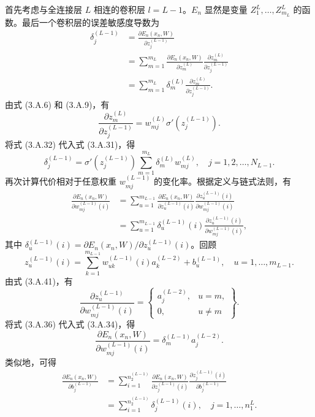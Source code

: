 首先考虑与全连接层 $L$ 相连的卷积层 $l=L-1$。$E_n$ 显然是变量 $Z_1^L,\ldots,Z_{m_L}^L$ 的函数。最后一个卷积层的误差敏感度导数为
\begin{equation}
\begin{aligned}
\delta_j^{(L-1)}
&=\frac{\partial E_n(x_n,W)}{\partial z_j^{(L-1)}}\\
&=\sum_{m=1}^{m_L}\frac{\partial E_n(x_n,W)}{\partial z_m^{(L)}}
\frac{\partial z_m^{(L)}}{\partial z_j^{(L-1)}}\\
&=\sum_{m=1}^{m_L}\delta_m^{(L)}\frac{\partial z_m^{(L)}}{\partial z_j^{(L-1)}}.
\end{aligned}
\tag{3.A.31}
\end{equation}
由式 (3.A.6) 和 (3.A.9)，有
\begin{equation}
\frac{\partial z_m^{(L)}}{\partial z_j^{(L-1)}}
=w_{mj}^{(L)}\sigma'(z_j^{(L-1)}).
\tag{3.A.32}
\end{equation}
将式 (3.A.32) 代入式 (3.A.31)，得
\begin{equation}
\delta_j^{(L-1)}=\sigma'(z_j^{(L-1)})
\sum_{m=1}^{m_L}\delta_m^{(L)}w_{mj}^{(L)},\quad j=1,2,\ldots,N_{L-1}.
\tag{3.A.33}
\end{equation}
再次计算代价相对于任意权重 $w_{mj}^{(L-1)}$ 的变化率。根据定义与链式法则，有
\begin{equation}
\begin{aligned}
\frac{\partial E_n(x_n,W)}{\partial w_{mj}^{(L-1)}(i)}
&=\sum_{u=1}^{m_{L-1}}\frac{\partial E_n(x_n,W)}{\partial z_u^{(L-1)}(i)}
\frac{\partial z_u^{(L-1)}(i)}{\partial w_{mj}^{(L-1)}(i)}\\
&=\sum_{u=1}^{m_{L-1}}\delta_u^{(L-1)}(i)
\frac{\partial z_u^{(L-1)}(i)}{\partial w_{mj}^{(L-1)}(i)},
\end{aligned}
\tag{3.A.34}
\end{equation}
其中 $\delta_u^{(L-1)}(i)=\partial E_n(x_n,W)/\partial z_u^{(L-1)}(i)$。回顾
\begin{equation}
z_u^{(L-1)}(i)=\sum_{k=1}^{m_{L-1}}w_{uk}^{(L-1)}(i)a_k^{(L-2)}+b_u^{(L-1)},
\quad u=1,\ldots,m_{L-1}.
\tag{3.A.35}
\end{equation}
由式 (3.A.41)，有
\begin{equation}
\frac{\partial z_u^{(L-1)}}{\partial w_{mj}^{(L-1)}(i)}
=\left\{\begin{array}{ll}a_j^{(L-2)},&u=m,\\0,&u\ne m\end{array}\right\}.
\tag{3.A.36}
\end{equation}
将式 (3.A.36) 代入式 (3.A.34)，得
\begin{equation}
\frac{\partial E_n(x_n,W)}{\partial w_{mj}^{(L-1)}(i)}
=\delta_m^{(L-1)}a_j^{(L-2)}.
\tag{3.A.37}
\end{equation}
类似地，可得
\begin{equation}
\begin{aligned}
\frac{\partial E_n(x_n,W)}{\partial b_j^{(L-1)}}
&=\sum_{i=1}^{n_2^{(L-1)}}\frac{\partial E_n(x_n,W)}{\partial z_j^{(L-1)}(i)}
\frac{\partial z_j^{(L-1)}(i)}{\partial b_j^{(L-1)}}\\
&=\sum_{i=1}^{n_2^{(L-1)}}\delta_j^{(L-1)}(i),\quad j=1,\ldots,n_1^L.
\end{aligned}
\tag{3.A.38}
\end{equation}

